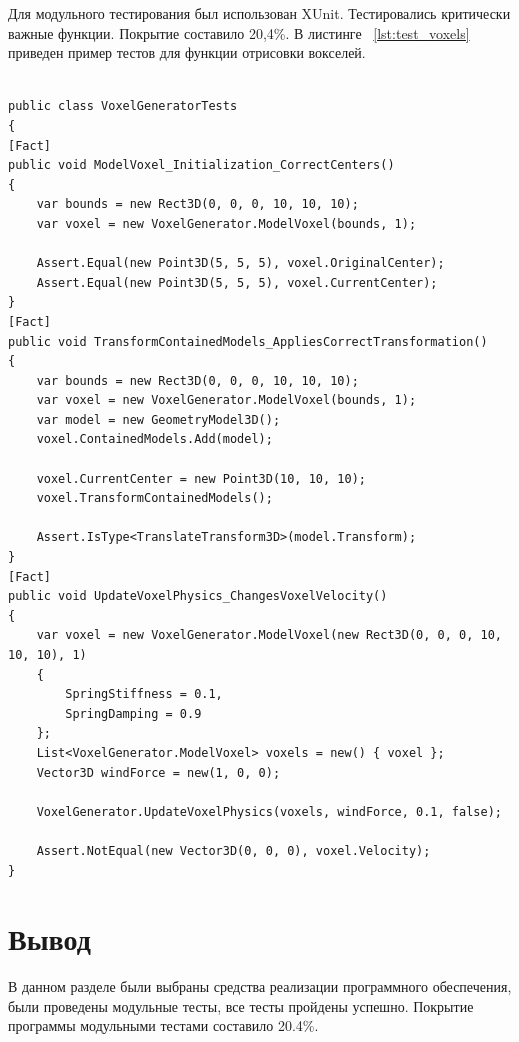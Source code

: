 Для модульного тестирования был использован XUnit. Тестировались критически важные функции. Покрытие составило 20,4\%. В листинге ~\ref{lst:test_voxels} приведен пример тестов для функции отрисовки вокселей.
\newpage
\begin{lstlisting}[style=C, caption={Тест для функций отрисовки вокселей},label={lst:test_voxels}]

public class VoxelGeneratorTests
{
[Fact]
public void ModelVoxel_Initialization_CorrectCenters()
{
	var bounds = new Rect3D(0, 0, 0, 10, 10, 10);
	var voxel = new VoxelGenerator.ModelVoxel(bounds, 1);
	
	Assert.Equal(new Point3D(5, 5, 5), voxel.OriginalCenter);
	Assert.Equal(new Point3D(5, 5, 5), voxel.CurrentCenter);
}
[Fact]
public void TransformContainedModels_AppliesCorrectTransformation()
{
	var bounds = new Rect3D(0, 0, 0, 10, 10, 10);
	var voxel = new VoxelGenerator.ModelVoxel(bounds, 1);
	var model = new GeometryModel3D();
	voxel.ContainedModels.Add(model);
	
	voxel.CurrentCenter = new Point3D(10, 10, 10);
	voxel.TransformContainedModels();
	
	Assert.IsType<TranslateTransform3D>(model.Transform);
}
[Fact]
public void UpdateVoxelPhysics_ChangesVoxelVelocity()
{
	var voxel = new VoxelGenerator.ModelVoxel(new Rect3D(0, 0, 0, 10, 10, 10), 1)
	{
		SpringStiffness = 0.1,
		SpringDamping = 0.9
	};
	List<VoxelGenerator.ModelVoxel> voxels = new() { voxel };
	Vector3D windForce = new(1, 0, 0);
	
	VoxelGenerator.UpdateVoxelPhysics(voxels, windForce, 0.1, false);
	
	Assert.NotEqual(new Vector3D(0, 0, 0), voxel.Velocity);
}

\end{lstlisting}

\section*{Вывод}
В данном разделе были выбраны средства реализации программного обеспечения, были проведены модульные тесты, все тесты пройдены успешно. Покрытие программы модульными тестами составило 20.4\%.

